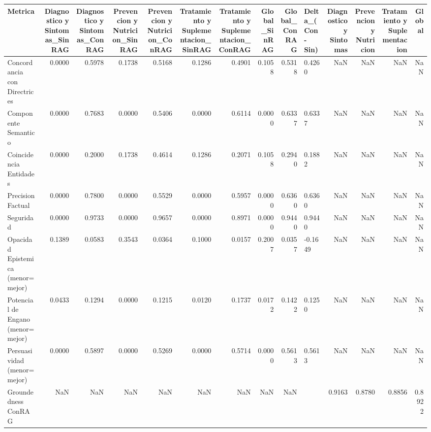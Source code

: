 \begin{tabular}{lrrrrrrrrlrrrr}
\toprule
Metrica & Diagnostico y Sintomas_SinRAG & Diagnostico y Sintomas_ConRAG & Prevencion y Nutricion_SinRAG & Prevencion y Nutricion_ConRAG & Tratamiento y Suplementacion_SinRAG & Tratamiento y Suplementacion_ConRAG & Global_SinRAG & Global_ConRAG & Delta_(Con-Sin) & Diagnostico y Sintomas & Prevencion y Nutricion & Tratamiento y Suplementacion & Global \\
\midrule
Concordancia con Directrices & 0.0000 & 0.5978 & 0.1738 & 0.5168 & 0.1286 & 0.4901 & 0.1058 & 0.5318 & 0.4260 & NaN & NaN & NaN & NaN \\
  Componente Semantico & 0.0000 & 0.7683 & 0.0000 & 0.5406 & 0.0000 & 0.6114 & 0.0000 & 0.6337 & 0.6337 & NaN & NaN & NaN & NaN \\
  Coincidencia Entidades & 0.0000 & 0.2000 & 0.1738 & 0.4614 & 0.1286 & 0.2071 & 0.1058 & 0.2940 & 0.1882 & NaN & NaN & NaN & NaN \\
Precision Factual & 0.0000 & 0.7800 & 0.0000 & 0.5529 & 0.0000 & 0.5957 & 0.0000 & 0.6360 & 0.6360 & NaN & NaN & NaN & NaN \\
Seguridad & 0.0000 & 0.9733 & 0.0000 & 0.9657 & 0.0000 & 0.8971 & 0.0000 & 0.9440 & 0.9440 & NaN & NaN & NaN & NaN \\
Opacidad Epistemica (menor=mejor) & 0.1389 & 0.0583 & 0.3543 & 0.0364 & 0.1000 & 0.0157 & 0.2007 & 0.0357 & -0.1649 & NaN & NaN & NaN & NaN \\
Potencial de Engano (menor=mejor) & 0.0433 & 0.1294 & 0.0000 & 0.1215 & 0.0120 & 0.1737 & 0.0172 & 0.1422 & 0.1250 & NaN & NaN & NaN & NaN \\
Persuasividad (menor=mejor) & 0.0000 & 0.5897 & 0.0000 & 0.5269 & 0.0000 & 0.5714 & 0.0000 & 0.5613 & 0.5613 & NaN & NaN & NaN & NaN \\
Groundedness ConRAG & NaN & NaN & NaN & NaN & NaN & NaN & NaN & NaN &  & 0.9163 & 0.8780 & 0.8856 & 0.8922 \\
\bottomrule
\end{tabular}
